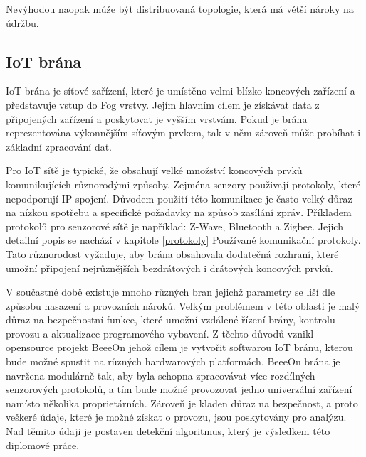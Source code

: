  Nevýhodou naopak může být distribuovaná topologie, která má větší nároky na údržbu.
 
 \subsection{IoT brána} 
 IoT brána je síťové zařízení, které je umístěno velmi blízko koncových zařízení
 a představuje vstup do Fog vrstvy. Jejím hlavním cílem je získávat data 
 z připojených zařízení a poskytovat je vyšším vrstvám. Pokud je brána reprezentována
 výkonnějším síťovým prvkem, tak v něm zároveň může probíhat i základní zpracování
 dat. 
 
 Pro IoT sítě je typické, že obsahují velké množství koncových prvků komunikujících
 různorodými způsoby. Zejména senzory použivají protokoly, které nepodporují
 IP spojení. Důvodem použití této komunikace je často velký
 důraz na nízkou spotřebu a specifické požadavky na způsob zasílání zpráv.
 Příkladem protokolů pro senzorové sítě je například:
 Z-Wave, Bluetooth a Zigbee. Jejich detailní popis se nachází v kapitole 
 \ref{protokoly} Používané komunikační protokoly.
 Tato různorodost vyžaduje, aby brána obsahovala dodatečná rozhraní, které 
 umožní připojení nejrůznějších bezdrátových i drátových koncových prvků. 
 
 V součastné době existuje mnoho různých bran jejichž parametry se liší dle 
 způsobu nasazení a provozních nároků. Velkým problémem v této oblasti je malý 
 důraz na bezpečnostní funkce, které umožní vzdálené řízení brány, kontrolu provozu a 
 aktualizace programového vybavení. Z těchto důvodů vznikl opensource projekt BeeeOn \cite{beeeon}
 jehož cílem je vytvořit softwarou IoT bránu, kterou bude možné spustit na různých 
 hardwarových platformách. BeeeOn brána je navržena modulárně tak, aby byla schopna 
 zpracovávat více rozdílných senzorových protokolů, a tím bude možné provozovat jedno
 univerzální zařízení namísto několika proprietárních. Zároveň je kladen důraz na bezpečnost, 
 a proto veškeré údaje, které je možné získat o provozu, jsou poskytovány pro analýzu. Nad těmito údaji
 je postaven detekční algoritmus, který je výsledkem této diplomové práce.
 

